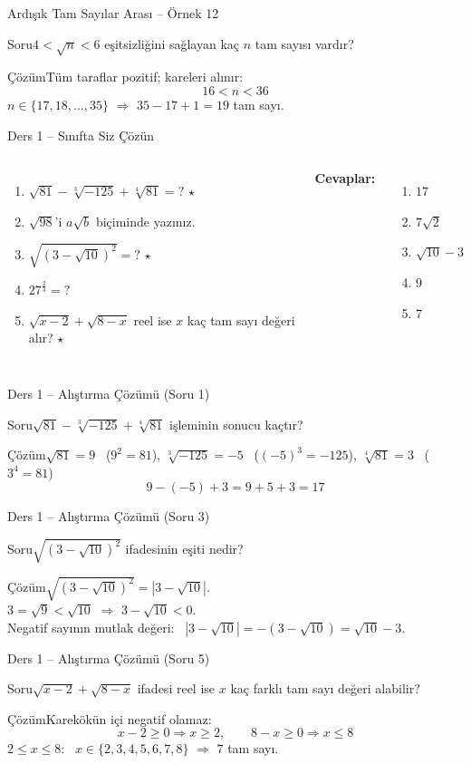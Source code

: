 \documentclass[aspectratio=169,11pt,handout]{beamer}
\newcommand{\soru}[3]{%
\begin{frame}{#1}
  \begin{block}{Soru}\large #2\end{block}
  \pause
  \begin{exampleblock}{Çözüm}\large #3\end{exampleblock}
\end{frame}}
\begin{document}
\soru{Ardışık Tam Sayılar Arası -- Örnek 12}
{\(4<\sqrt{n}<6\) eşitsizliğini sağlayan kaç \(n\) tam sayısı vardır?}
{Tüm taraflar pozitif; kareleri alınır:
\[16<n<36\]
\(n\in\{17,18,\dots,35\}\) \(\Rightarrow\) \(35-17+1=19\) tam sayı.}

\begin{frame}{Ders 1 -- Sınıfta Siz Çözün}
\begin{columns}[t]
\begin{enumerate}
\item \(\sqrt{81}-\sqrt[3]{-125}+\sqrt[4]{81}=?\) \(\star\)
\item \(\sqrt{98}\)'i \(a\sqrt{b}\) biçiminde yazınız.
\item \(\sqrt{(3-\sqrt{10})^2}=?\) \(\star\)
\item \(27^{\frac23}=?\)
\item \(\sqrt{x-2}+\sqrt{8-x}\) reel ise \(x\) kaç tam sayı değeri alır? \(\star\)
\end{enumerate}
\pause
\textbf{Cevaplar:}
\begin{enumerate}
\item \(17\)
\item \(7\sqrt2\)
\item \(\sqrt{10}-3\)
\item \(9\)
\item \(7\)
\end{enumerate}
\end{columns}
\vspace{4pt}{\footnotesize \(\star\) işaretli soruların adım adım çözümü sonraki slaytlardadır.}
\end{frame}

\soru{Ders 1 -- Alıştırma Çözümü (Soru 1)}
{\(\sqrt{81}-\sqrt[3]{-125}+\sqrt[4]{81}\) işleminin sonucu kaçtır?}
{\(\sqrt{81}=9\) \ (\(9^2=81\)), \quad \(\sqrt[3]{-125}=-5\) \ (\((-5)^3=-125\)), \quad \(\sqrt[4]{81}=3\) \ (\(3^4=81\))
\[9-(-5)+3=9+5+3=17\]}

\soru{Ders 1 -- Alıştırma Çözümü (Soru 3)}
{\(\sqrt{(3-\sqrt{10})^2}\) ifadesinin eşiti nedir?}
{\(\sqrt{(3-\sqrt{10})^2}=|3-\sqrt{10}|\).\\[3pt]
\(3=\sqrt9<\sqrt{10}\) \(\Rightarrow\) \(3-\sqrt{10}<0\).\\[3pt]
Negatif sayının mutlak değeri: \ \(|3-\sqrt{10}|=-(3-\sqrt{10})=\sqrt{10}-3\).}

\soru{Ders 1 -- Alıştırma Çözümü (Soru 5)}
{\(\sqrt{x-2}+\sqrt{8-x}\) ifadesi reel ise \(x\) kaç farklı tam sayı değeri alabilir?}
{Karekökün içi negatif olamaz:
\[x-2\ge 0\Rightarrow x\ge 2,\qquad 8-x\ge 0\Rightarrow x\le 8\]
\(2\le x\le 8\): \ \(x\in\{2,3,4,5,6,7,8\}\) \(\Rightarrow\) \(7\) tam sayı.}
\end{document}

